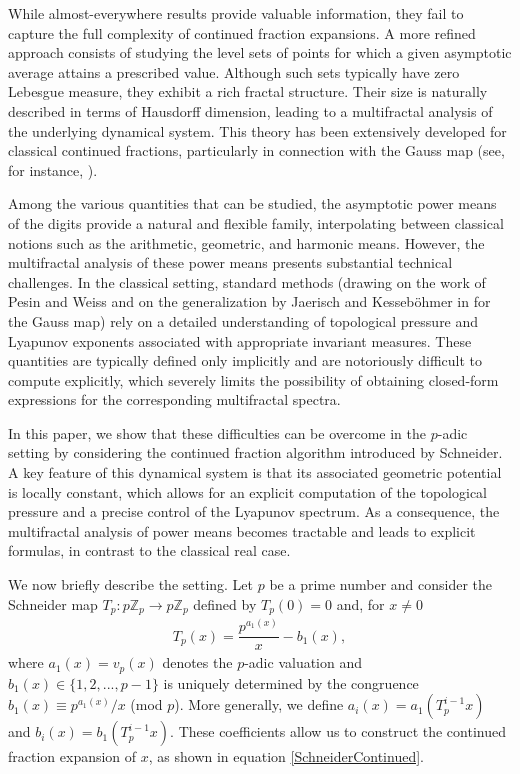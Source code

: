 \documentclass[11pt]{amsart}
\theoremstyle{remark}
\numberwithin{equation}{section}
\newcommand{\Z}{\mathbb{Z}}
\begin{document}
While almost-everywhere results provide valuable information, they fail to capture the full complexity of continued fraction expansions. A more refined approach consists of studying the level sets of points for which a given asymptotic average attains a prescribed value. Although such sets typically have zero Lebesgue measure, they exhibit a rich fractal structure. Their size is naturally described in terms of Hausdorff dimension, leading to a multifractal analysis of the underlying dynamical system. This theory has been extensively developed for classical continued fractions, particularly in connection with the Gauss map (see, for instance, \cite[Section 6]{iommi2015multifractal}).

Among the various quantities that can be studied, the asymptotic power means of the digits provide a natural and flexible family, interpolating between classical notions such as the arithmetic, geometric, and harmonic means. However, the multifractal analysis of these power means presents substantial technical challenges. In the classical setting, standard methods (drawing on the work of Pesin and Weiss \cite{yh} and on the generalization by Jaerisch and Kesseb{\"o}hmer in \cite{jaerisch2011regularity} for the Gauss map) rely on a detailed understanding of topological pressure and Lyapunov exponents associated with appropriate invariant measures. These quantities are typically defined only implicitly and are notoriously difficult to compute explicitly, which severely limits the possibility of obtaining closed-form expressions for the corresponding multifractal spectra.

In this paper, we show that these difficulties can be overcome in the $p$-adic setting by considering the continued fraction algorithm introduced by Schneider. A key feature of this dynamical system is that its associated geometric potential is locally constant, which allows for an explicit computation of the topological pressure and a precise control of the Lyapunov spectrum. As a consequence, the multifractal analysis of power means becomes tractable and leads to explicit formulas, in contrast to the classical real case.

We now briefly describe the setting. Let $p$ be a prime number and consider the Schneider map $T_{p}:p\Z_{p}\rightarrow p\Z_{p}$ defined by $T_{p}(0)=0$ and, for $x\neq 0$
  \begin{align*}
      T_{p}(x)=\dfrac{p^{a_{1}(x)}}{x}-b_{1}(x),
  \end{align*} where $a_{1}(x)=v_{p}(x)$ denotes the $p$-adic valuation and $b_1(x)\in\{1,2,...,p-1\}$ is uniquely determined by the congruence $b_{1}(x)\equiv p^{a_{1}(x)}/x$ (mod $p$). More generally, we define $a_i(x)=a_1(T_p^{i-1}x)$ and $b_i(x)=b_1(T_p^{i-1}x).$ These coefficients allow us to construct the continued fraction expansion of $x$, as shown in equation \eqref{SchneiderContinued}.
\end{document}
